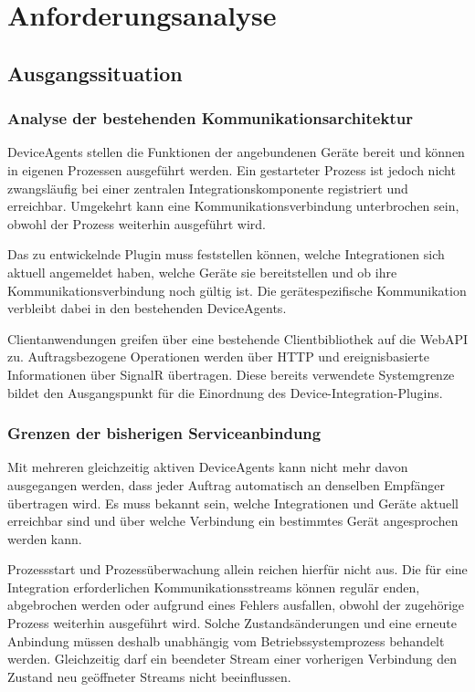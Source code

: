 \chapter{Anforderungsanalyse}\label{ch:anforderungsanalyse}

\section{Ausgangssituation}

\subsection{Analyse der bestehenden Kommunikationsarchitektur}

DeviceAgents stellen die Funktionen der angebundenen Geräte bereit und können in eigenen Prozessen ausgeführt werden. Ein gestarteter Prozess ist jedoch nicht zwangsläufig bei einer zentralen Integrationskomponente registriert und erreichbar. Umgekehrt kann eine Kommunikationsverbindung unterbrochen sein, obwohl der Prozess weiterhin ausgeführt wird.

Das zu entwickelnde Plugin muss feststellen können, welche Integrationen sich aktuell angemeldet haben, welche Geräte sie bereitstellen und ob ihre Kommunikationsverbindung noch gültig ist. Die gerätespezifische Kommunikation verbleibt dabei in den bestehenden DeviceAgents.

Clientanwendungen greifen über eine bestehende Clientbibliothek auf die WebAPI zu. Auftragsbezogene Operationen werden über HTTP und ereignisbasierte Informationen über SignalR übertragen. Diese bereits verwendete Systemgrenze bildet den Ausgangspunkt für die Einordnung des Device-Integration-Plugins.

\subsection{Grenzen der bisherigen Serviceanbindung}

Mit mehreren gleichzeitig aktiven DeviceAgents kann nicht mehr davon ausgegangen werden, dass jeder Auftrag automatisch an denselben Empfänger übertragen wird. Es muss bekannt sein, welche Integrationen und Geräte aktuell erreichbar sind und über welche Verbindung ein bestimmtes Gerät angesprochen werden kann.

Prozessstart und Prozessüberwachung allein reichen hierfür nicht aus. Die für eine Integration erforderlichen Kommunikationsstreams können regulär enden, abgebrochen werden oder aufgrund eines Fehlers ausfallen, obwohl der zugehörige Prozess weiterhin ausgeführt wird. Solche Zustandsänderungen und eine erneute Anbindung müssen deshalb unabhängig vom Betriebssystemprozess behandelt werden. Gleichzeitig darf ein beendeter Stream einer vorherigen Verbindung den Zustand neu geöffneter Streams nicht beeinflussen.


